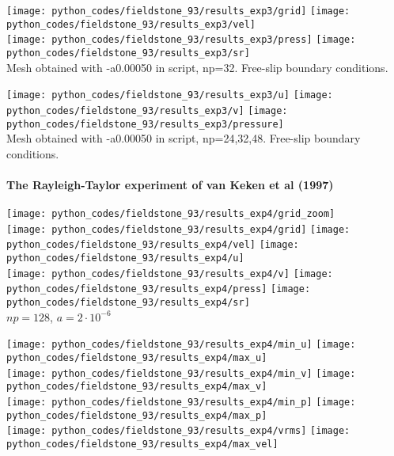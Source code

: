 \begin{center}
\texttt{[image: python\_codes/fieldstone\_93/results\_exp3/grid]}
\texttt{[image: python\_codes/fieldstone\_93/results\_exp3/vel]}\\
\texttt{[image: python\_codes/fieldstone\_93/results\_exp3/press]}
\texttt{[image: python\_codes/fieldstone\_93/results\_exp3/sr]}\\
{\captionfont  Mesh obtained with -a0.00050 in script, np=32. Free-slip boundary conditions.}
\end{center}

\begin{center}
\texttt{[image: python\_codes/fieldstone\_93/results\_exp3/u]}
\texttt{[image: python\_codes/fieldstone\_93/results\_exp3/v]}
\texttt{[image: python\_codes/fieldstone\_93/results\_exp3/pressure]}\\
{\captionfont  Mesh obtained with -a0.00050 in script, np=24,32,48. Free-slip boundary conditions.}
\end{center}

\newpage
\paragraph{The Rayleigh-Taylor experiment of van Keken et al (1997) \cite{vaks97}}

\begin{center}
\texttt{[image: python\_codes/fieldstone\_93/results\_exp4/grid\_zoom]}\\
\texttt{[image: python\_codes/fieldstone\_93/results\_exp4/grid]}
\texttt{[image: python\_codes/fieldstone\_93/results\_exp4/vel]}
\texttt{[image: python\_codes/fieldstone\_93/results\_exp4/u]}\\
\texttt{[image: python\_codes/fieldstone\_93/results\_exp4/v]}
\texttt{[image: python\_codes/fieldstone\_93/results\_exp4/press]}
\texttt{[image: python\_codes/fieldstone\_93/results\_exp4/sr]}\\
{\captionfont $np=128$, $a=2\cdot10^{-6}$}
\end{center}


\begin{center}
\texttt{[image: python\_codes/fieldstone\_93/results\_exp4/min\_u]}
\texttt{[image: python\_codes/fieldstone\_93/results\_exp4/max\_u]}\\
\texttt{[image: python\_codes/fieldstone\_93/results\_exp4/min\_v]}
\texttt{[image: python\_codes/fieldstone\_93/results\_exp4/max\_v]}\\
\texttt{[image: python\_codes/fieldstone\_93/results\_exp4/min\_p]}
\texttt{[image: python\_codes/fieldstone\_93/results\_exp4/max\_p]}\\
\texttt{[image: python\_codes/fieldstone\_93/results\_exp4/vrms]}
\texttt{[image: python\_codes/fieldstone\_93/results\_exp4/max\_vel]}\\
\end{center}


